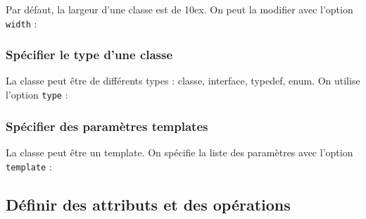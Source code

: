 \documentclass[a4paper,11pt]{report}
\newcommand{\inputTikZ}[1]{%
  }%
\newcommand{\inputTikZ}[1]{%
    \texttt{[image: fig/\#1.pdf]}%
  }%
\begin{document}
Par défaut, la largeur d'une classe est de 10ex. On peut la modifier avec l'option {\tt width} :

\medskip

\begin{minipage}{0.5\textwidth}

\end{minipage}
\begin{minipage}{0.4\textwidth}
\begin{center}
\inputTikZ{figure4}
\end{center}
\end{minipage}

\subsubsection{Spécifier le type d'une classe}

La classe peut être de différents types : classe, interface, typedef, enum. On utilise l'option {\tt type} :

\medskip

\begin{minipage}{0.5\textwidth}

\end{minipage}
\begin{minipage}{0.4\textwidth}
\begin{center}
\inputTikZ{figure5}
\end{center}
\end{minipage}

\subsubsection{Spécifier des paramètres templates}

La classe peut être un template. On spécifie la liste des paramètres avec l'option {\tt template} :

\medskip

\begin{minipage}{0.5\textwidth}

\end{minipage}
\begin{minipage}{0.4\textwidth}
\begin{center}
\inputTikZ{figure6}
\end{center}
\end{minipage}

\subsection{Définir des attributs et des opérations}\label{ss.attrop}
\end{document}
